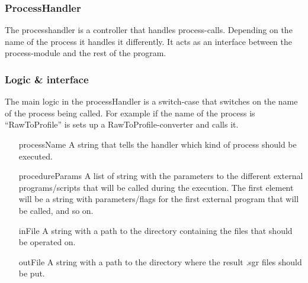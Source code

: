 \subsubsection{ProcessHandler}
The processhandler is a controller that handles process-calls. Depending on the name of the process it handles it differently. It acts as an interface between the process-module and the rest of the program. 


\subsubsection{Logic \& interface}
The main logic in the processHandler is a switch-case that switches on the name of the process being called. For example if the name of the process is “RawToProfile” is sets up a RawToProfile-converter and calls it. 

\begin{itemize}
\item[processName] A string that tells the handler which kind of process should be executed.
\item[procedureParams] A list of string with the parameters to the different external  programs/scripts that will be called during the execution. The first element will be a string with parameters/flags for the first external program that will be called, and so on.
\item[inFile] A string with a path to the directory containing the files that should be operated on.
\item[outFile] A string with a path to the directory where the result .sgr files should be put.

\end{itemize}




